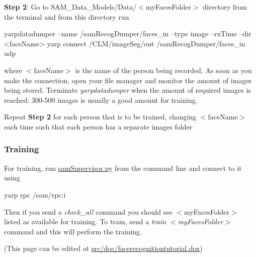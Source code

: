 {\bfseries Step 2}\+: Go to S\+A\+M\+\_\+\+Data\+\_\+\+Models/\+Data/$<$my\+Faces\+Folder$>$ directory from the terminal and from this directory run

\begin{DoxyVerb}yarpdatadumper --name /samRecogDumper/faces_in --type image --rxTime --dir <faceName>
yarp connect /CLM/imageSeg/out /samRecogDumper/faces_in udp\end{DoxyVerb}


where {\ttfamily $<$face\+Name$>$} is the name of the person being recorded. As soon as you make the connection, open your file manager and monitor the amount of images being stored. Terminate {\itshape yarpdatadumper} when the amount of required images is reached\+: 300-\/500 images is usually a good amount for training.

Repeat {\bfseries Step 2} for each person that is to be trained, changing {\ttfamily $<$face\+Name$>$} each time such that each person has a separate images folder

\subsubsection*{Training}

For training, run \hyperlink{samSupervisor_8py}{sam\+Supervisor.\+py} from the command line and connect to it using \begin{DoxyVerb}yarp rpc /sam/rpc:i \end{DoxyVerb}


Then if you send a {\itshape check\+\_\+all} command you should see $<$my\+Faces\+Folder$>$ listed as available for training. To train, send a {\itshape train $<$my\+Faces\+Folder$>$} command and this will perform the training.

(This page can be edited at \hyperlink{facerecognitiontutorial_8dox}{src/doc/facerecognitiontutorial.\+dox}) 